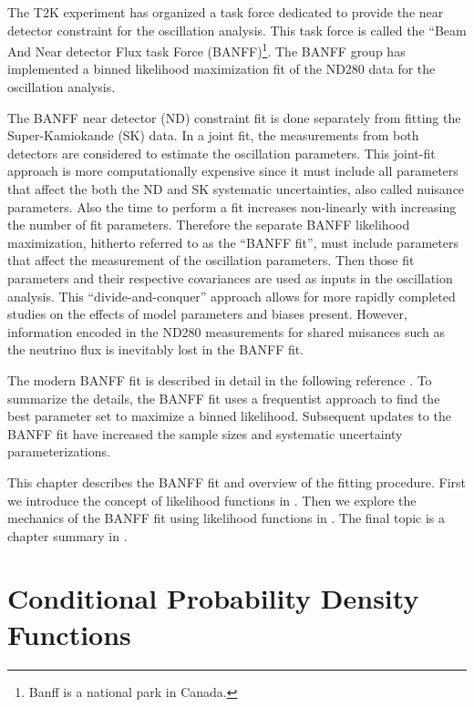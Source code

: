 The T2K experiment has organized a task force dedicated to provide
the near detector constraint for the oscillation analysis. This task
force is called the ``Beam And Near detector Flux task Force (BANFF)\footnote{Banff is a national park in Canada.}.
The BANFF group has implemented a binned likelihood maximization fit
of the ND280 data for the oscillation analysis\cite{Abe2015c}.

The BANFF near detector (ND) constraint fit is done separately from
fitting the Super-Kamiokande (SK) data. In a joint fit, the measurements
from both detectors are considered to estimate the oscillation parameters.
This joint-fit approach is more computationally expensive since it
must include all parameters that affect the both the ND and SK systematic
uncertainties, also called nuisance parameters. Also the time to perform
a fit increases non-linearly with increasing the number of fit parameters.
Therefore the separate BANFF likelihood maximization, hitherto referred
to as the ``BANFF fit'', must include parameters that affect the
measurement of the oscillation parameters. Then those fit parameters
and their respective covariances are used as inputs in the oscillation
analysis. This ``divide-and-conquer'' approach allows for more rapidly
completed studies on the effects of model parameters and biases present.
However, information encoded in the ND280 measurements for shared
nuisances such as the neutrino flux is inevitably lost in the BANFF
fit.

The modern BANFF fit is described in detail in the following reference
\cite{Abe:2017vif}. To summarize the details, the BANFF fit uses
a frequentist approach to find the best parameter set to maximize
a binned likelihood. Subsequent updates to the BANFF fit have increased
the sample sizes and systematic uncertainty parameterizations.

This chapter describes the BANFF fit and overview of the fitting procedure.
First we introduce the concept of likelihood functions in .
Then we explore the mechanics of the BANFF fit using likelihood functions
in . The final topic is a chapter summary
in .


\section{Conditional Probability Density Functions\label{sec:Conditional-Probability-Density}}

